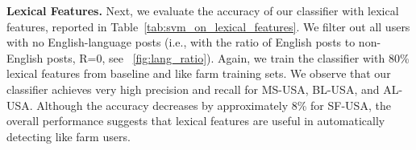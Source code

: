 \documentclass[twocolumn,10pt,letterpaper]{article}
\newcommand{\descr}[1]{\smallskip\noindent\textbf{#1}}
\begin{document}
\begin{table*}[t]
\tabcolsep=0.11cm
  \begin{center}
   \small
{}
\vspace{-0.15cm}   
      \caption{Effectiveness of lexical features (+SVM) in detecting like farm users.}
      \label{tab:svm_on_lexical_features}
  \end{center}
\end{table*}

%
%
%
%
%
%
%
%
%
%
%
%
%
%
%
%
%
%
%
%
%
%
%
%
%
%
%
%
%
%
%
%
%
%



\descr{Lexical Features.}
Next, we evaluate the accuracy of our classifier with lexical features, reported in Table~\ref{tab:svm_on_lexical_features}. We filter out all users with no English-language posts (i.e., with the ratio of English posts to non-English posts, R=0, see \figurename~\ref{fig:lang_ratio}). Again, we train the classifier with 80\% lexical features from baseline and like farm training sets. We observe that our classifier achieves very high precision and recall for MS-USA, BL-USA, and AL-USA. Although the accuracy decreases by approximately 8\% for SF-USA, the overall performance suggests that lexical features are useful in automatically detecting like farm users.
\end{document}
